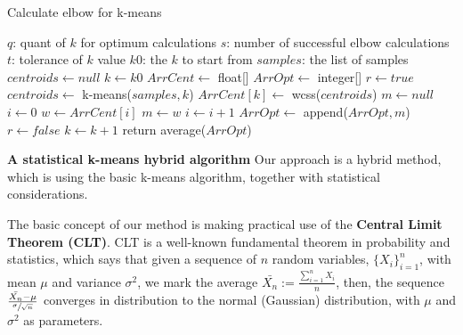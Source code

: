 \documentclass[12pt]{article}
\begin{document}
\begin{algorithm}
\caption{Calculate elbow for k-means}
\begin{algorithmic} 
\REQUIRE
\STATE $q$: quant of $k$ for optimum calculations
\STATE $s$: number of successful elbow calculations
\STATE $t$: tolerance of $k$ value
\STATE $k0$: the $k$ to start from
\STATE $samples$: the list of samples
\ENSURE 
\STATE $centroids \leftarrow null$
\newline
\STATE $k \leftarrow k0$
\newline
\STATE $ArrCent \leftarrow $ float[]
\STATE $ArrOpt \leftarrow $ integer[]
\newline
\STATE $r \leftarrow true$
\newline
{}
\STATE $centroids \leftarrow $ k-means($samples, k$)
\newline
\STATE $ArrCent[k] \leftarrow $ wcss($centroids$)
\newline
{}
\STATE $m \leftarrow null$
\newline
\STATE $i \leftarrow 0$
\STATE $w \leftarrow ArrCent[i]$
\newline
{}
\STATE $m \leftarrow w$
\ENDIF
\newline
\STATE $i \leftarrow i+1$
\ENDWHILE
\STATE $ArrOpt \leftarrow $ append($ArrOpt,m$)
\ENDIF
{}
\STATE $r \leftarrow false$
\ELSE
\STATE $k \leftarrow k+1$
\ENDIF
\newline
\ENDWHILE
\STATE return average($ArrOpt$)
\end{algorithmic}
\end{algorithm}

\newpage
\textbf{\large A statistical k-means hybrid algorithm} \newline
Our approach is a hybrid method, which is using the basic k-means algorithm, together with statistical considerations. \newline

The basic concept of our method is making practical use of the \textbf{Central Limit Theorem (CLT)}. \newline
CLT is a well-known fundamental theorem in probability and statistics, which says that given a sequence of $n$ random variables, \( \{X_i\}_{i=1}^n \), with mean $\mu$ and variance $\sigma^2$, we mark the average 
\( \bar{X_n}:=\frac{\sum_{i=1}^n X_i}{n} \), then,\newline
the sequence \( \frac{\bar{X_n}-\mu}{\sfrac{\sigma}{\sqrt{n}}} \) converges in distribution 
to the normal (Gaussian) distribution, with $\mu$ and $\sigma^2$ as parameters.
\end{document}

